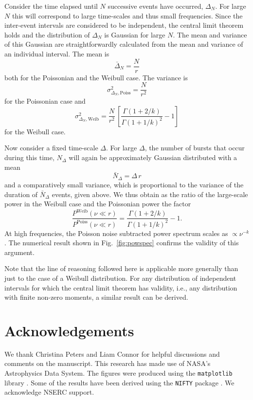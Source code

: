 \documentclass[fleqn,usenatbib]{mnras}
\newcommand{\new}[1]{#1}
\begin{document}
\new{Consider the time elapsed until $N$ successive events have occurred, $\Delta_N$. For large $N$ this will correspond to large time-scales and thus small frequencies. Since the inter-event intervals are considered to be independent, the central limit theorem holds and the distribution of $\Delta_N$ is Gaussian for large $N$. The mean and variance of this Gaussian are straightforwardly calculated from the mean and variance of an individual interval. The mean is
\begin{equation}
	\bar{\Delta}_N = \frac{N}{r}
\end{equation}
both for the Poissonian and the Weibull case. The variance is
\begin{equation}
	\sigma^2_{\Delta_N,\mathrm{Poiss}} = \frac{N}{r^2}
\end{equation}
for the Poissonian case and
\begin{equation}
	\sigma^2_{\Delta_N,\mathrm{Weib}} = \frac{N}{r^2} \, \left[\frac{\Gamma\left(1 + 2/k\right)}{\Gamma\left(1 + 1/k\right)^2} - 1\right]
\end{equation}
for the Weibull case.}

\new{Now consider a fixed time-scale $\Delta$. For large $\Delta$, the number of bursts that occur during this time, $N_\Delta$ will again be approximately Gaussian distributed with a mean
\begin{equation}
	\bar{N}_\Delta = \Delta \, r
\end{equation}
and a comparatively small variance, which is proportional to the variance of the duration of $\bar{N}_\Delta$ events, given above. We thus obtain as the ratio of the large-scale power in the Weibull case and the Poissonian power the factor
\begin{equation}
	\frac{P^{\mathrm{Weib}}(\nu \ll r)}{P^{\mathrm{Poiss}}(\nu \ll r)} = \frac{\Gamma\left(1 + 2/k\right)}{\Gamma\left(1 + 1/k\right)^2} - 1.
\end{equation}
At high frequencies, the Poisson noise subtracted power spectrum scales as $\propto \nu^{-k}$.
The numerical result shown in Fig.~\ref{fig:powspec} confirms the validity of this argument.}

\new{Note that the line of reasoning followed here is applicable more generally than just to the case of a Weibull distribution. For any distribution of independent intervals for which the central limit theorem has validity, i.e., any distribution with finite non-zero moments, a similar result can be derived.}


\section*{Acknowledgements}

We thank \new{Christina Peters and Liam Connor for helpful discussions and comments on the manuscript}. This research has made use of NASA's Astrophysics Data System. The figures were produced using the \texttt{matplotlib} library \citep{hunter-2007}. \new{Some of the results have been derived using the \texttt{NIFTY} package \citep{selig-2013}.} We acknowledge NSERC support.







\bsp
\label{lastpage}
\end{document}
